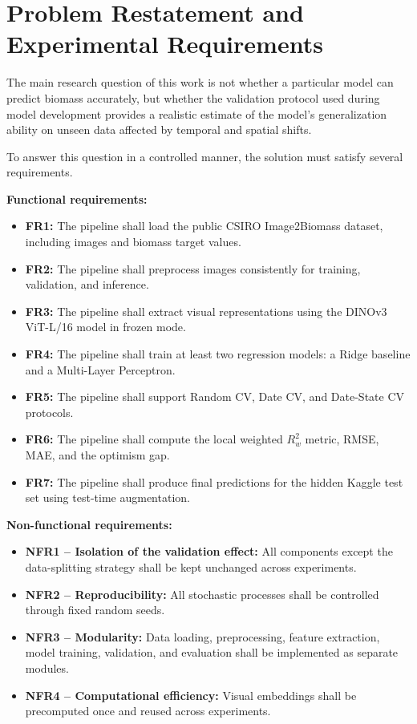 \section{Problem Restatement and Experimental Requirements}

The main research question of this work is not whether a particular model can predict biomass accurately, but whether the validation protocol used during model development provides a realistic estimate of the model's generalization ability on unseen data affected by temporal and spatial shifts.

To answer this question in a controlled manner, the solution must satisfy several requirements.

\textbf{Functional requirements:}
\begin{itemize}
    \item \textbf{FR1:} The pipeline shall load the public CSIRO Image2Biomass dataset, including images and biomass target values.
    \item \textbf{FR2:} The pipeline shall preprocess images consistently for training, validation, and inference.
    \item \textbf{FR3:} The pipeline shall extract visual representations using the DINOv3 ViT-L/16 model in frozen mode.
    \item \textbf{FR4:} The pipeline shall train at least two regression models: a Ridge baseline and a Multi-Layer Perceptron.
    \item \textbf{FR5:} The pipeline shall support Random CV, Date CV, and Date-State CV protocols.
    \item \textbf{FR6:} The pipeline shall compute the local weighted $R^2_w$ metric, RMSE, MAE, and the optimism gap.
    \item \textbf{FR7:} The pipeline shall produce final predictions for the hidden Kaggle test set using test-time augmentation.
\end{itemize}

\textbf{Non-functional requirements:}
\begin{itemize}
    \item \textbf{NFR1 -- Isolation of the validation effect:} All components except the data-splitting strategy shall be kept unchanged across experiments.
    \item \textbf{NFR2 -- Reproducibility:} All stochastic processes shall be controlled through fixed random seeds.
    \item \textbf{NFR3 -- Modularity:} Data loading, preprocessing, feature extraction, model training, validation, and evaluation shall be implemented as separate modules.
    \item \textbf{NFR4 -- Computational efficiency:} Visual embeddings shall be precomputed once and reused across experiments.
\end{itemize}

